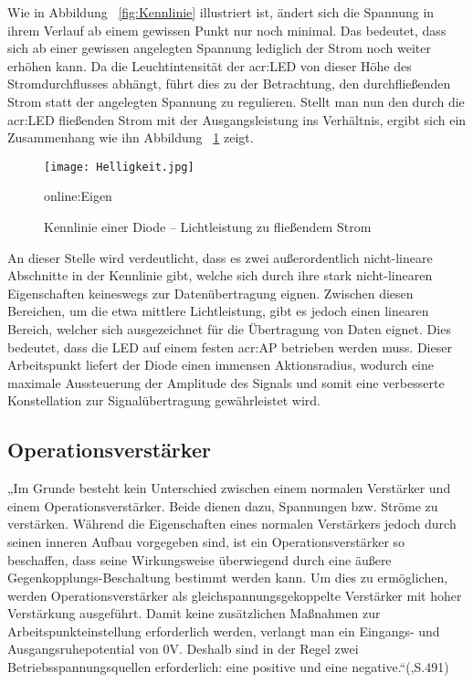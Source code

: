 Wie in Abbildung ~\ref{fig:Kennlinie} illustriert ist, ändert sich die Spannung in ihrem Verlauf ab einem gewissen Punkt nur noch minimal. Das bedeutet, dass sich ab einer gewissen angelegten Spannung lediglich der Strom noch weiter erhöhen kann. Da die Leuchtintensität der \gls{acr:LED} von dieser Höhe des Stromdurchflusses abhängt, führt dies zu der Betrachtung, den durchfließenden Strom statt der angelegten Spannung zu regulieren. Stellt man nun den durch die \gls{acr:LED} fließenden Strom mit der Ausgangsleistung ins Verhältnis, ergibt sich ein Zusammenhang wie ihn Abbildung ~\ref{fig:Helligkeit} zeigt. 

\begin{figure}[H]
	\centering
	\texttt{[image: Helligkeit.jpg]}
	\caption[Kennlinie einer Diode – Lichtleistung zu fließendem Strom]{Kennlinie einer Diode – Lichtleistung zu fließendem Strom} 
	\gls{online:Eigen}
	\label{fig:Helligkeit}
\end{figure}

An dieser Stelle wird verdeutlicht, dass es zwei außerordentlich nicht-lineare Abschnitte in der Kennlinie gibt, welche sich durch ihre stark nicht-linearen Eigenschaften keineswegs zur Datenübertragung eignen. Zwischen diesen Bereichen, um die etwa mittlere Lichtleistung, gibt es jedoch einen linearen Bereich, welcher sich ausgezeichnet für die Übertragung von Daten eignet. Dies bedeutet, dass die LED auf einem festen \gls{acr:AP} betrieben werden muss. Dieser Arbeitspunkt liefert der Diode einen immensen Aktionsradius, wodurch eine maximale Aussteuerung der Amplitude des Signals und somit eine verbesserte Konstellation zur Signalübertragung gewährleistet wird. \cite{kavehradVisibleLightCommunication2019}


\subsection{Operationsverstärker}
\label{subsec:OP}

„Im Grunde besteht kein Unterschied zwischen einem normalen Verstärker und einem Operationsverstärker. Beide dienen dazu, Spannungen bzw. Ströme zu verstärken. Während die Eigenschaften eines normalen Verstärkers jedoch durch seinen inneren Aufbau vorgegeben sind, ist ein Operationsverstärker so beschaffen, dass seine Wirkungsweise überwiegend durch eine äußere Gegenkopplungs-Beschaltung bestimmt werden kann. Um dies zu ermöglichen, werden Operationsverstärker als gleichspannungsgekoppelte Verstärker mit hoher Verstärkung ausgeführt. Damit keine zusätzlichen Maßnahmen zur Arbeitspunkteinstellung erforderlich werden, verlangt man ein Eingangs- und Ausgangsruhepotential von 0V. Deshalb sind in der Regel zwei Betriebsspannungsquellen erforderlich: eine positive und eine negative.“(\cite{tietzeElectronicCircuits2008},S.491)


